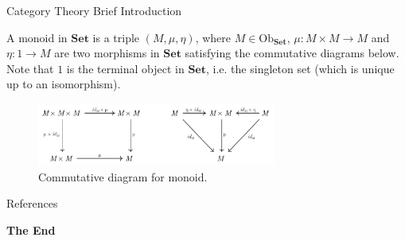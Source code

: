 \documentclass[aspectratio=169,xcolor=dvipsnames,10pt]{beamer}
\theoremstyle{definition}
\begin{document}
\begin{frame}[fragile]{Category Theory Brief Introduction}
	\begin{definition}
		A monoid in $\mathbf{Set}$ is a triple $(M, \mu, \eta)$, where $M \in \text{Ob}_\mathbf{Set}$,
		$\mu:M \times M \to M$ and $\eta: 1 \to M$ are two morphisms in $\mathbf{Set}$ satisfying the
		commutative diagrams below. Note that $1$ is the terminal object in $\mathbf{Set}$, i.e.
		the singleton set (which is unique up to an isomorphism).

		\begin{figure}[H]
			\begin{center}
				\includegraphics[width=0.7\textwidth]{./figs/MonoidalCategory.pdf}
			\end{center}
			\caption{Commutative diagram for monoid.}
			\label{fig:monoid-diagram}
		\end{figure}
		\label{def:monoid-cat}
	\end{definition}
\end{frame}



\begin{frame}{References}
    \footnotesize
    
    
\end{frame}


\begin{frame}
    \Huge{\centerline{\textbf{The End}}}
\end{frame}

\end{document}
